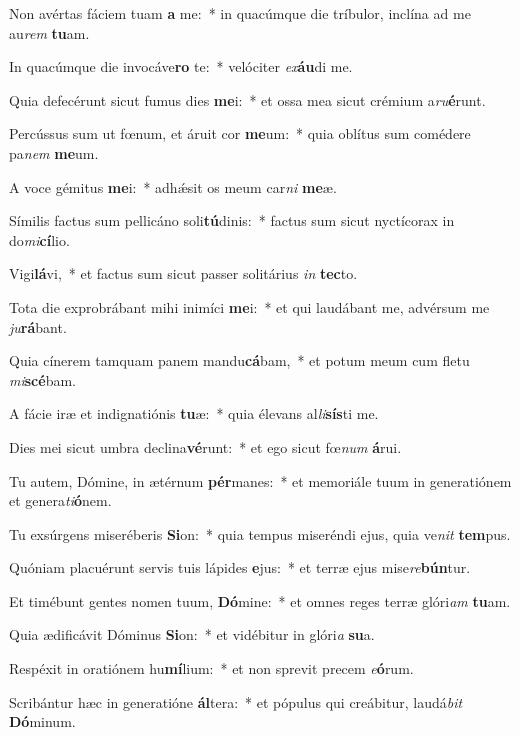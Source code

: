 \item Non avértas fáciem tuam \textbf{a} me:~* in quacúmque die tríbulor, inclína ad me au\textit{rem} \textbf{tu}am.
\item In quacúmque die invocáve\textbf{ro} te:~* velóciter \textit{ex}\textbf{áu}di me.
\item Quia defecérunt sicut fumus dies \textbf{me}i:~* et ossa mea sicut crémium a\textit{ru}\textbf{é}runt.
\item Percússus sum ut fœnum, et áruit cor \textbf{me}um:~* quia oblítus sum comédere pa\textit{nem} \textbf{me}um.
\item A voce gémitus \textbf{me}i:~* adhǽsit os meum car\textit{ni} \textbf{me}æ.
\item Símilis factus sum pellicáno soli\textbf{tú}dinis:~* factus sum sicut nyctícorax in do\textit{mi}\textbf{cí}lio.
\item Vigi\textbf{lá}vi,~* et factus sum sicut passer solitárius \textit{in} \textbf{tec}to.
\item Tota die exprobrábant mihi inimíci \textbf{me}i:~* et qui laudábant me, advérsum me \textit{ju}\textbf{rá}bant.
\item Quia cínerem tamquam panem mandu\textbf{cá}bam,~* et potum meum cum fletu \textit{mi}\textbf{scé}bam.
\item A fácie iræ et indignatiónis \textbf{tu}æ:~* quia élevans al\textit{li}\textbf{sís}ti me.
\item Dies mei sicut umbra declina\textbf{vé}runt:~* et ego sicut fœ\textit{num} \textbf{á}rui.
\item Tu autem, Dómine, in ætérnum \textbf{pér}manes:~* et memoriále tuum in generatiónem et genera\textit{ti}\textbf{ó}nem.
\item Tu exsúrgens miseréberis \textbf{Si}on:~* quia tempus miseréndi ejus, quia ve\textit{nit} \textbf{tem}pus.
\item Quóniam placuérunt servis tuis lápides \textbf{e}jus:~* et terræ ejus mise\textit{re}\textbf{bún}tur.
\item Et timébunt gentes nomen tuum, \textbf{Dó}mine:~* et omnes reges terræ glóri\textit{am} \textbf{tu}am.
\item Quia ædificávit Dóminus \textbf{Si}on:~* et vidébitur in glóri\textit{a} \textbf{su}a.
\item Respéxit in oratiónem hu\textbf{mí}lium:~* et non sprevit precem \textit{e}\textbf{ó}rum.
\item Scribántur hæc in generatióne \textbf{ál}tera:~* et pópulus qui creábitur, laudá\textit{bit} \textbf{Dó}minum.
